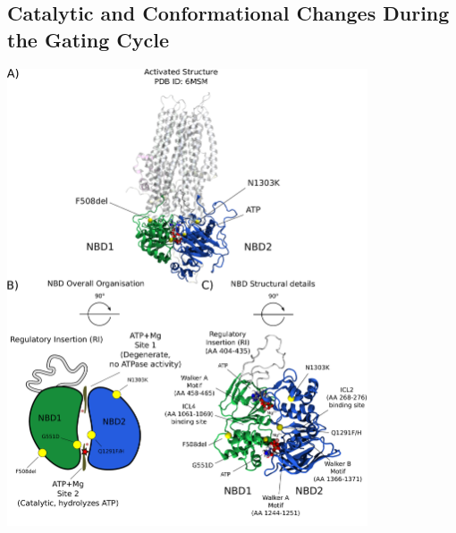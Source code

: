 
\subsection{Catalytic and Conformational Changes During the Gating Cycle}

	\begin{center}
	\includegraphics[width=0.8\textwidth]{figures/ATP_head_to_tail_figure.pdf}
	\end{center}
	\begingroup
	\captionsetup{singlelinecheck = false, justification=raggedright}
